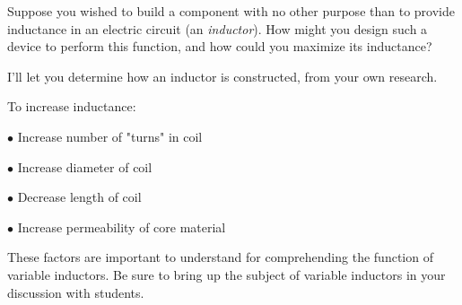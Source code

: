 

Suppose you wished to build a component with no other purpose than to provide inductance in an electric circuit (an {\it inductor}).  How might you design such a device to perform this function, and how could you maximize its inductance?







I'll let you determine how an inductor is constructed, from your own research.

\vskip 10pt

To increase inductance: 

\medskip
\item{$\bullet$} Increase number of "turns" in coil
\item{$\bullet$} Increase diameter of coil
\item{$\bullet$} Decrease length of coil
\item{$\bullet$} Increase permeability of core material
\medskip







These factors are important to understand for comprehending the function of variable inductors.  Be sure to bring up the subject of variable inductors in your discussion with students.




